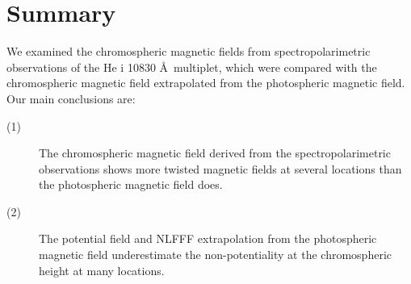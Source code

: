 \documentclass[manuscript]{aastex61}
\begin{document}
%

\section{Summary}
We examined the chromospheric magnetic fields from spectropolarimetric observations 
of the He {\sc i} 10830 \AA\ multiplet, which were compared with the 
chromospheric magnetic field extrapolated from the photospheric magnetic field. 
Our main conclusions are:
\begin{description}
\item[(1)] The chromospheric magnetic field derived from the spectropolarimetric observations shows more twisted magnetic fields at several locations than the photospheric magnetic field does.
\item[(2)] The potential field and NLFFF extrapolation from the photospheric magnetic field 
underestimate the non-potentiality at the chromospheric height at many locations.
\end{description}
\end{document}
